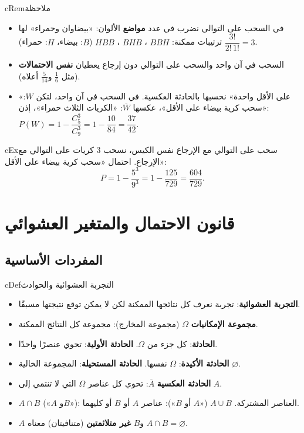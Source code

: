 \documentclass[12pt,a4paper]{article}
\newenvironment{BOX}[2]{\begin{otherlanguage}{english}\begin{arbox}{#1}{#2}}{\end{arbox}\end{otherlanguage}}
\newenvironment{tarif}[1][تعريف]{\begin{BOX}{cDef}{#1}}{\end{BOX}}
\newenvironment{molahada}[1][ملاحظة]{\begin{BOX}{cRem}{#1}}{\end{BOX}}
\newenvironment{mithal}[1][مثال]{\begin{BOX}{cEx}{#1}}{\end{BOX}}
\begin{document}
\begin{molahada}
\begin{itemize}
\item في السحب على التوالي نضرب في عدد \textbf{مواضع} الألوان: «بيضاوان وحمراء» لها $\dfrac{3!}{2!\,1!}=3$ ترتيبات ممكنة: $BBH$ ، $BHB$ ، $HBB$ ($B$: بيضاء، $H$: حمراء).
\item السحب في آن واحد والسحب على التوالي دون إرجاع يعطيان \textbf{نفس الاحتمالات} (مثل $\frac16$ و$\frac{5}{14}$ أعلاه).
\item «على الأقل واحدة» نحسبها بالحادثة العكسية. في السحب في آن واحد، لتكن $W$: «سحب كرية بيضاء على الأقل»، عكسها $\overline{W}$: «الكريات الثلاث حمراء»، إذن:
$P(W)=1-\dfrac{C_5^3}{C_9^3}=1-\dfrac{10}{84}=\dfrac{37}{42}$.
\end{itemize}
\end{molahada}

\begin{mithal}[سحب على التوالي مع الإرجاع]
نفس الكيس، نسحب $3$ كريات على التوالي مع الإرجاع. احتمال «سحب كرية بيضاء على الأقل»:
\[P=1-\frac{5^3}{9^3}=1-\frac{125}{729}=\frac{604}{729}.\]
\end{mithal}

\section{قانون الاحتمال والمتغير العشوائي}
\subsection{المفردات الأساسية}
\begin{tarif}[التجربة العشوائية والحوادث]
\begin{itemize}
\item \textbf{التجربة العشوائية}: تجربة نعرف كل نتائجها الممكنة لكن لا يمكن توقع نتيجتها مسبقًا.
\item \textbf{مجموعة الإمكانيات} $\Omega$ (مجموعة المخارج): مجموعة كل النتائج الممكنة.
\item \textbf{الحادثة}: كل جزء من $\Omega$. \textbf{الحادثة الأولية}: تحوي عنصرًا واحدًا.
\item \textbf{الحادثة الأكيدة}: $\Omega$ نفسها. \textbf{الحادثة المستحيلة}: المجموعة الخالية $\varnothing$.
\item \textbf{الحادثة العكسية} $\overline{A}$: تحوي كل عناصر $\Omega$ التي لا تنتمي إلى $A$.
\item $A\cap B$ («$A$ و$B$»): العناصر المشتركة. \quad $A\cup B$ («$A$ أو $B$»): عناصر $A$ أو $B$ أو كليهما.
\item $A$ و$B$ \textbf{غير متلائمتين} (متنافيتان) معناه $A\cap B=\varnothing$.
\end{itemize}
\end{tarif}
\end{document}
